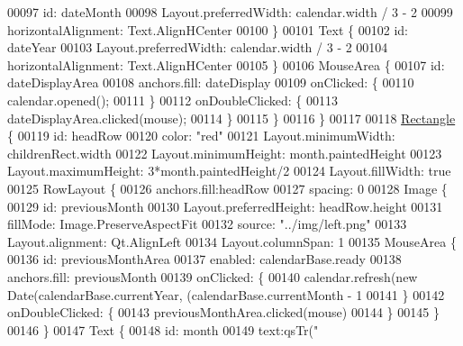 \begin{DoxyCode}
{{00097                 \textcolor{keywordtype}{id}: dateMonth
00098                 Layout.preferredWidth: calendar.width / 3 - 2
00099                 horizontalAlignment: Text.AlignHCenter
00100             \}
00101             Text \{
00102                 \textcolor{keywordtype}{id}: dateYear
00103                 Layout.preferredWidth: calendar.width / 3 - 2
00104                 horizontalAlignment: Text.AlignHCenter
00105             \}
00106             MouseArea \{
00107                 \textcolor{keywordtype}{id}: dateDisplayArea
00108                 anchors.fill: dateDisplay
00109                 onClicked: \{
00110                     calendar.opened();
00111                 \}
00112                 onDoubleClicked: \{
00113                     dateDisplayArea.clicked(mouse);
00114                 \}
00115             \}
00116         \}
00117 
00118         \hyperlink{classRectangle}{Rectangle} \{
00119             \textcolor{keywordtype}{id}: headRow
00120             color: \textcolor{stringliteral}{"red"}
00121             Layout.minimumWidth: childrenRect.width
00122             Layout.minimumHeight: month.paintedHeight
00123             Layout.maximumHeight: 3*month.paintedHeight/2
00124             Layout.fillWidth: \textcolor{keyword}{true}
00125             RowLayout \{
00126                 anchors.fill:headRow
00127                 spacing: 0
00128                 Image \{
00129                     \textcolor{keywordtype}{id}: previousMonth
00130                     Layout.preferredHeight: headRow.height
00131                     fillMode: Image.PreserveAspectFit
00132                     source: \textcolor{stringliteral}{"../img/left.png"}
00133                     Layout.alignment: Qt.AlignLeft
00134                     Layout.columnSpan: 1
00135                     MouseArea \{
00136                         \textcolor{keywordtype}{id}: previousMonthArea
00137                         enabled: calendarBase.ready
00138                         anchors.fill: previousMonth
00139                         onClicked: \{
00140                             calendar.refresh(\textcolor{keyword}{new} Date(calendarBase.currentYear, (calendarBase.currentMonth 
      - 1 %
00141                         \}
00142                         onDoubleClicked: \{
00143                             previousMonthArea.clicked(mouse)
00144                         \}
00145                     \}
00146                 \}
00147                 Text \{
00148                     \textcolor{keywordtype}{id}: month
00149                     text:qsTr(\textcolor{stringliteral}{"%
}}}
\end{DoxyCode}
